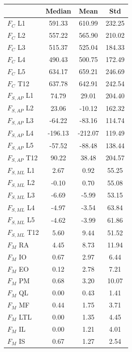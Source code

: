 \begin{table}[h]
\centering
\begin{tabular}{lccc}
\toprule
 & \bfseries Median & \bfseries Mean & \bfseries Std \\
\midrule
$F_{C}$ L1 & 591.33 & 610.99 & 232.25 \\
$F_{C}$ L2 & 557.22 & 565.90 & 210.02 \\
$F_{C}$ L3 & 515.37 & 525.04 & 184.33 \\
$F_{C}$ L4 & 490.43 & 500.75 & 172.49 \\
$F_{C}$ L5 & 634.17 & 659.21 & 246.69 \\
$F_{C}$ T12 & 637.78 & 642.91 & 242.54 \\
$F_{S,AP}$ L1 & 74.79 & 29.01 & 204.40 \\
$F_{S,AP}$ L2 & 23.06 & -10.12 & 162.32 \\
$F_{S,AP}$ L3 & -64.22 & -83.16 & 114.74 \\
$F_{S,AP}$ L4 & -196.13 & -212.07 & 119.49 \\
$F_{S,AP}$ L5 & -57.52 & -88.48 & 138.44 \\
$F_{S,AP}$ T12 & 90.22 & 38.48 & 204.57 \\
$F_{S,ML}$ L1 & 2.67 & 0.92 & 55.25 \\
$F_{S,ML}$ L2 & -0.10 & 0.70 & 55.08 \\
$F_{S,ML}$ L3 & -6.69 & -5.99 & 53.15 \\
$F_{S,ML}$ L4 & -4.97 & -3.54 & 63.84 \\
$F_{S,ML}$ L5 & -4.62 & -3.99 & 61.86 \\
$F_{S,ML}$ T12 & 5.60 & 9.44 & 51.52 \\
$F_M$ RA & 4.45 & 8.73 & 11.94 \\
$F_M$ IO & 0.67 & 2.97 & 6.44 \\
$F_M$ EO & 0.12 & 2.78 & 7.21 \\
$F_M$ PM & 0.68 & 3.20 & 10.07 \\
$F_M$ QL & 0.00 & 0.43 & 1.41 \\
$F_M$ MF & 0.44 & 1.75 & 3.71 \\
$F_M$ LTL & 0.00 & 1.35 & 4.45 \\
$F_M$ IL & 0.00 & 1.21 & 4.01 \\
$F_M$ IS & 0.67 & 1.27 & 2.54 \\
\bottomrule
\end{tabular}
\end{table}
